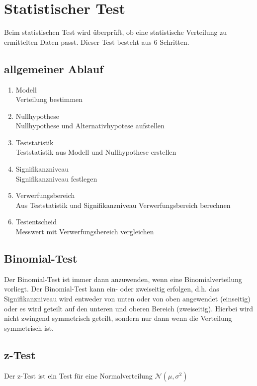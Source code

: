 \section{Statistischer Test}
Beim statistischen Test wird überprüft, ob eine statistische Verteilung zu 
ermittelten Daten passt. Dieser Test besteht aus 6 Schritten. 

\subsection{allgemeiner Ablauf}
\begin{enumerate}
  \item Modell \\
        Verteilung bestimmen
  \item Nullhypothese \\
        Nullhypothese und Alternativhypotese aufstellen
  \item Teststatistik \\
        Teststatistik aus Modell und Nullhypothese erstellen
  \item Signifikanzniveau \\
        Signifikanzniveau festlegen
  \item Verwerfungsbereich \\
        Aus Teststatistik und Signifikanzniveau Verwerfungsbereich berechnen
  \item Testentscheid \\
        Messwert mit Verwerfungsbereich vergleichen
\end{enumerate}

\subsection{Binomial-Test}
Der Binomial-Test ist immer dann anzuwenden, wenn eine Binomialverteilung
vorliegt. Der Binomial-Test kann ein- oder zweiseitig erfolgen, d.h. das
Signifikanzniveau wird entweder von unten oder von oben angewendet (einseitig)
oder es wird geteilt auf den unteren und oberen Bereich (zweiseitig). 
Hierbei wird nicht zwingend symmetrisch geteilt, sondern nur dann wenn
die Verteilung symmetrisch ist.


\subsection{z-Test}
Der z-Test ist ein Test für eine Normalverteilung $\mathcal{N}(\mu, \sigma^2)$



